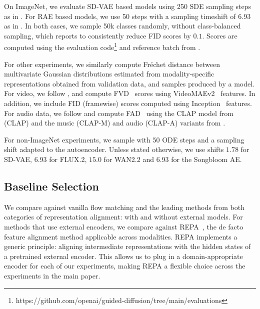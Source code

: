 \documentclass{article}
\theoremstyle{plain}
\theoremstyle{definition}
\theoremstyle{remark}
\begin{document}
On ImageNet, we evaluate SD-VAE based models using 250 SDE sampling steps as in \cite{sit}. For RAE based models, we use 50 steps with a sampling timeshift of $6.93$ as in \cite{rae}. In both cases, we sample 50k classes randomly, without class-balanced sampling, which \cite{rae} reports to consistently reduce FID scores by $0.1$. Scores are computed using the evaluation code\footnote{https://github.com/openai/guided-diffusion/tree/main/evaluations} and reference batch from \cite{adm}.

For other experiments, we similarly compute Fr\'echet distance between multivariate Gaussian distributions estimated from modality-specific representations obtained from validation data, and samples produced by a model. For video, we follow \cite{ge2024content}, and compute FVD~\cite{unterthiner2018towards} scores using VideoMAEv2~\cite{wang2023videomae} features. In addition, we include FID (framewise) scores computed using Inception~\cite{szegedy2015going} features. For audio data, we follow \cite{fadtk, emotionbias_fad} and compute FAD~\cite{kilgour2019frechetaudiodistancemetric} using the CLAP model from \cite{elizalde2022claplearningaudioconcepts} (CLAP) and the music (CLAP-M) and audio (CLAP-A) variants from \cite{wu2024largescalecontrastivelanguageaudiopretraining}.

For non-ImageNet experiments, we sample with 50 ODE steps and a sampling shift adapted to the autoencoder. Unless stated otherwise, we use shifts $1.78$ for SD-VAE, $6.93$ for FLUX.2, $15.0$ for WAN2.2 and $6.93$ for the Songbloom AE.

\subsection{Baseline Selection}
\label{suppsec:layersync}
We compare against vanilla flow matching and the leading methods from both categories of representation alignment: with and without external models. For methods that use external encoders, we compare against REPA~\cite{repa}, the de facto feature alignment method applicable across modalities. REPA implements a generic principle: aligning intermediate representations with the hidden states of a pretrained external encoder. This allows us to plug in a domain-appropriate encoder for each of our experiments, making REPA a flexible choice across the experiments in the main paper.
\end{document}
